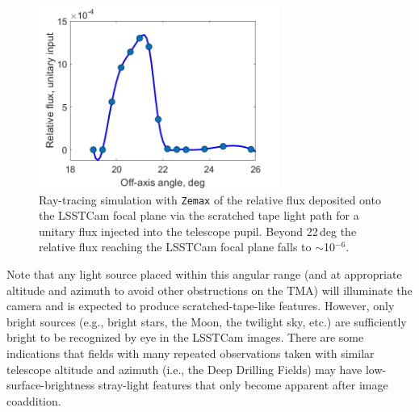 \documentclass[SE,authoryear,toc]{lsstdoc}
\begin{document}
\begin{figure}[!h]
    \centering
    \includegraphics[width=0.7\textwidth]{figures/scratched_tape_flux.png}
    \caption{\label{fig:st_flux}Ray-tracing simulation with \texttt{Zemax} of the relative flux deposited onto the LSSTCam focal plane via the scratched tape light path for a unitary flux injected into the telescope pupil. Beyond 22\,deg the relative flux reaching the LSSTCam focal plane falls to $\sim$10$^{-6}$.
}
\end{figure}

Note that any light source placed within this angular range (and at appropriate altitude and azimuth to avoid other obstructions on the TMA) will illuminate the camera and is expected to produce scratched-tape-like features. However, only bright sources (e.g., bright stars, the Moon, the twilight sky, etc.) are sufficiently bright to be recognized by eye in the LSSTCam images. There are some indications that fields with many repeated observations taken with similar telescope altitude and azimuth (i.e., the Deep Drilling Fields) may have low-surface-brightness stray-light features that only become apparent after image coaddition.
\end{document}
